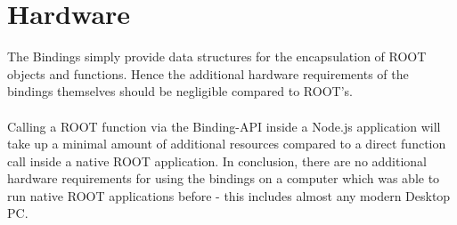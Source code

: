 \section{Hardware}

The Bindings simply provide data structures for the encapsulation of ROOT objects and functions. Hence the additional hardware requirements of the bindings themselves 
should be negligible compared to ROOT's.\\ \\
Calling a ROOT function via the Binding-API inside a Node.js application will take up a minimal amount of additional resources compared to a direct function call inside a native ROOT application.
In conclusion, there are no additional hardware requirements for using the bindings on a computer which was able to run native ROOT applications before - this includes almost any modern Desktop PC.